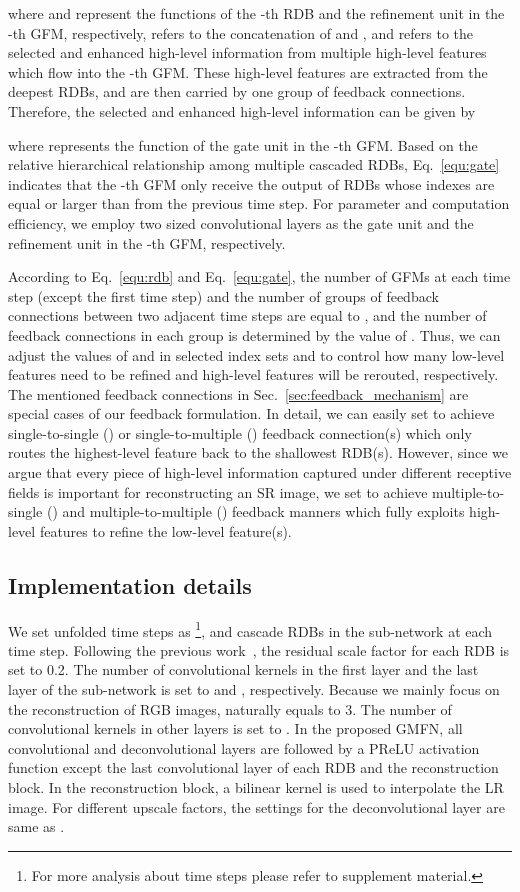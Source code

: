 \documentclass{bmvc2k}
\begin{document}
where  and  represent the functions of the -th RDB and the refinement unit in the -th GFM, respectively,  refers to the concatenation of  and , and  refers to the selected and enhanced high-level information from multiple high-level features which flow into the -th GFM. These high-level features are extracted from the deepest RDBs, and are then carried by one group of feedback connections. Therefore, the selected and enhanced high-level information  can be given by

where  represents the function of the gate unit in the -th GFM. Based on the relative hierarchical relationship among multiple cascaded RDBs, Eq.~\ref{equ:gate} indicates that the -th GFM only receive the output of RDBs whose indexes are equal or larger than  from the previous time step. For parameter and computation efficiency, we employ two  sized convolutional layers as the gate unit and the refinement unit in the -th GFM, respectively. 

 According to Eq.~\ref{equ:rdb} and Eq.~\ref{equ:gate}, the number of GFMs at each time step (except the first time step) and the number of groups of feedback connections between two adjacent time steps are equal to , and the number of feedback connections in each group is determined by the value of . Thus, we can adjust the values of  and  in selected index sets  and  to control how many low-level features need to be refined and high-level features will be rerouted, respectively. The mentioned feedback connections in Sec.~\ref{sec:feedback_mechanism} are special cases of our feedback formulation. In detail, we can easily set  to achieve single-to-single () or single-to-multiple () feedback connection(s) which only routes the highest-level feature back to the shallowest RDB(s). However, since we argue that every piece of high-level information captured under different receptive fields is important for reconstructing an SR image, we set  to achieve multiple-to-single () and multiple-to-multiple () feedback manners which fully exploits high-level features to refine the low-level feature(s). 
		\vspace{-\topsep}
\subsection{Implementation details}
\label{sec:id}
We set unfolded time steps as \footnote{For more analysis about time steps please refer to supplement material.}, and cascade  RDBs in the sub-network at each time step. Following the previous work~\cite{wang2018esrgan}, the residual scale factor for each RDB is set to 0.2. The number of convolutional kernels in the first layer and the last layer of the sub-network is set to  and , respectively. Because we mainly focus on the reconstruction of RGB images,  naturally equals to 3. The number of convolutional kernels in other layers is set to . In the proposed GMFN, all convolutional and deconvolutional layers are followed by a PReLU \cite{he2015delving} activation function except the last convolutional layer of each RDB and the reconstruction block. In the reconstruction block, a bilinear kernel is used to interpolate the LR image. For different upscale factors, the settings for the deconvolutional layer are same as \cite{li2019srfbn}.
	\vspace{-\topsep}
\end{document}
